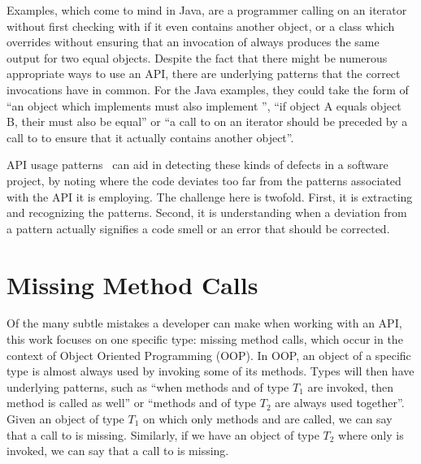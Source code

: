Examples, which come to mind in Java, are a programmer calling  on an iterator without first checking with  if it even contains another object, or a class which overrides  without ensuring that an invocation of  always produces the same output for two equal objects.
Despite the fact that there might be numerous appropriate ways to use an API, there are underlying patterns that the correct invocations have in common.
For the Java examples, they could take the form of ``an object which implements  must also implement '', ``if object A equals object B, their  must also be equal'' or ``a call to  on an iterator should be preceded by a call to  to ensure that it actually contains another object''.

API usage patterns~\cite{robillard2013automated} can aid in detecting these kinds of defects in a software project, by noting where the code deviates too far from the patterns associated with the API it is employing.
The challenge here is twofold.
First, it is extracting and recognizing the patterns.
Second, it is understanding when a deviation from a pattern actually signifies a code smell or an error that should be corrected.

\section{Missing Method Calls}

Of the many subtle mistakes a developer can make when working with an API, this work focuses on one specific type: missing method calls, which occur in the context of Object Oriented Programming (OOP).
In OOP, an object of a specific type is almost always used by invoking some of its methods.
Types will then have underlying patterns, such as ``when methods  and  of type $T_1$ are invoked, then method  is called as well'' or ``methods  and  of type $T_2$ are always used together''.
Given an object of type $T_1$ on which only methods  and  are called, we can say that a call to  is missing.
Similarly, if we have an object of type $T_2$ where only  is invoked, we can say that a call to  is missing.

